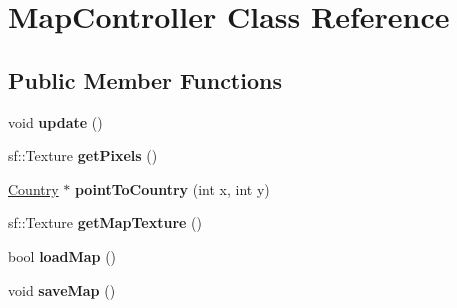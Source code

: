 \hypertarget{class_map_controller}{}\section{Map\+Controller Class Reference}
\label{class_map_controller}
\subsection*{Public Member Functions}
\begin{DoxyCompactItemize}
\item 
\hypertarget{class_map_controller_adced4bd3ec77f9b9be0dfe4d4f808780}{}void {\bfseries update} ()\label{class_map_controller_adced4bd3ec77f9b9be0dfe4d4f808780}

\item 
\hypertarget{class_map_controller_abb8a01b6107a60b4a7f6a37ac742b476}{}sf\+::\+Texture {\bfseries get\+Pixels} ()\label{class_map_controller_abb8a01b6107a60b4a7f6a37ac742b476}

\item 
\hypertarget{class_map_controller_a41e66a786f72c143fb707a9443f7d94e}{}\hyperlink{class_country}{Country} $\ast$ {\bfseries point\+To\+Country} (int x, int y)\label{class_map_controller_a41e66a786f72c143fb707a9443f7d94e}

\item 
\hypertarget{class_map_controller_a78ac4d045098a856b48d61e8e939e5aa}{}sf\+::\+Texture {\bfseries get\+Map\+Texture} ()\label{class_map_controller_a78ac4d045098a856b48d61e8e939e5aa}

\item 
\hypertarget{class_map_controller_a28af1c94f81b9d17d6251f02780d719a}{}bool {\bfseries load\+Map} ()\label{class_map_controller_a28af1c94f81b9d17d6251f02780d719a}

\item 
\hypertarget{class_map_controller_ac3ca01f97a9176e604c949abf3f85873}{}void {\bfseries save\+Map} ()\label{class_map_controller_ac3ca01f97a9176e604c949abf3f85873}

\end{DoxyCompactItemize}
